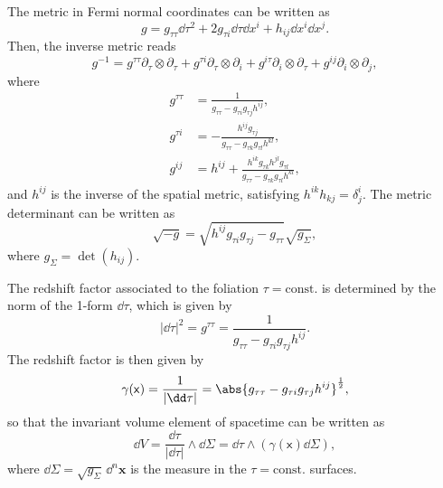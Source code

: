 \documentclass[letterpaper,12pt,titlepage,oneside,final]{book}
\newcommand{\mf}{\mathsf}%
\begin{document}
The metric in Fermi normal coordinates can be written as
\begin{equation}\label{eq:ADM}
    g = g_{\tau\tau}\dd\tau^2 +2g_{\tau i} \dd \tau \dd x^i+h_{ij}\dd x^i \dd x^j.
\end{equation}
Then, the inverse metric reads
\begin{equation}
    g^{-1} = g^{\tau\tau}\partial_\tau\otimes\partial_\tau + g^{\tau i}\partial_\tau \otimes \partial_i+g^{i\tau}\partial_i \otimes \partial_\tau + g^{ij}\partial_i\otimes\partial_j,
\end{equation}
where
\begin{align}
    g^{\tau\tau} &= \frac{1}{g_{\tau\tau} - g_{\tau i}g_{\tau j} h^{ij}},\\
    g^{\tau i} &= -\frac{h^{ij}g_{\tau j}}{g_{\tau\tau} - g_{\tau k}g_{\tau l} h^{kl}},\\
    g^{ij} &= h^{ij} + \frac{h^{ik}g_{\tau k}h^{jl}g_{\tau l}}{g_{\tau\tau} - g_{\tau k}g_{\tau l} h^{kl}},
\end{align}
and $h^{ij}$ is the inverse of the spatial metric, satisfying $h^{ik}h_{kj} = \delta^i_j$. The metric determinant can be written as
\begin{equation}
    \sqrt{-g} = \sqrt{h^{ij}g_{\tau i} g_{\tau j} -g_{\tau\tau}} \sqrt{g_{\Sigma}},
\end{equation}
where $g_{\Sigma} = \det(h_{ij})$.


The redshift factor associated to the foliation \mbox{$\tau = \text{const.}$} is determined by the norm of the 1-form $\dd \tau$, which is given by 
\begin{equation}
    {|\dd \tau|}^2 = g^{\tau\tau} = \frac{1}{g_{\tau\tau} - g_{\tau i}g_{\tau j} h^{ij}}.
\end{equation}
The redshift factor is then given by
\begin{equation}
    \gamma(\mf x) = \frac{1}{|\dd\tau|} = \abs{g_{\tau\tau} - g_{\tau i}g_{\tau j} h^{ij}}^\frac{1}{2},
\end{equation}
so that the invariant volume element of spacetime can be written as
\begin{equation}
    \dd V = \frac{\dd \tau}{|\dd \tau|}\wedge \dd \Sigma = \dd\tau \wedge(\gamma(\mf x) \dd \Sigma),
\end{equation}
where $\dd \Sigma = \sqrt{g_{\Sigma}}\,\dd^n \bm x$ is the measure in the \mbox{$\tau = \text{const}.$} surfaces.



\end{document}
